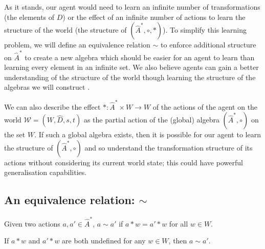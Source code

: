 As it stands, our agent would need to learn an infinite number of transformations (the elements of $D$) or the effect of an infinite number of actions to learn the structure of the world (the structure of $(\hat{A}^{\ast}, \circ, \ast)$).
To simplify this learning problem, we will define an equivalence relation $\sim$ to enforce additional structure on $\hat{A}^{\ast}$ to create a new algebra which should be easier for an agent to learn than learning every element in an infinite set.
We also believe agents can gain a better understanding of the structure of the world though learning the structure of the algebras we will construct .

We can also describe the effect $\ast: \hat{A}^{\ast} \times W \to W$ of the actions of the agent on the world $\mathscr{W} = (W, \hat{D}, s, t)$ as the partial action of the (global) algebra $(\hat{A}^{\ast}, \circ)$ on the set $W$.
If such a global algebra exists, then it is possible for our agent to learn the structure of $(\hat{A}^{\ast}, \circ)$ and so understand the transformation structure of its actions without considering its current world state; this could have powerful generalisation capabilities.

\subsection{An equivalence relation: $\sim$}

\begin{definition}
    Given two actions $a, a' \in \hat{A}^{\ast}$, $a \sim a'$ if $a \ast w = a' \ast w$ for all $w \in W$.
    
    If $a \ast w$ and $a' \ast w$ are both undefined for any $w \in W$, then $a \sim a'$.

\end{definition}

